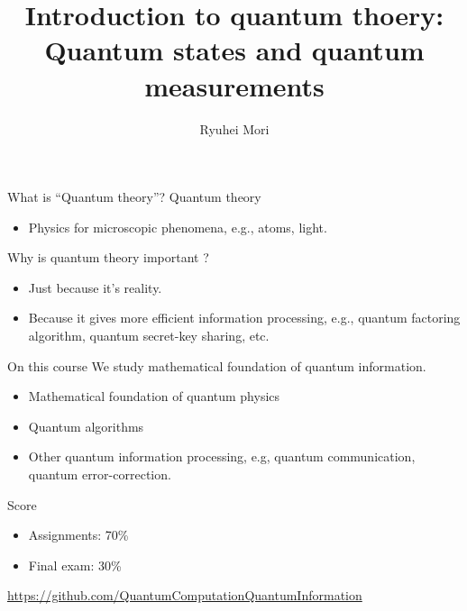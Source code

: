 \documentclass{beamer}
\title{Introduction to quantum thoery: Quantum states and quantum measurements}
\author{Ryuhei Mori}
\institute{Tokyo Institute of Technology}
\begin{document}
\begin{frame}[plain]
\maketitle
\end{frame}


\begin{frame}{What is ``Quantum theory''?}
Quantum theory

\vspace{1em}
\begin{itemize}
\item Physics for microscopic phenomena, e.g., atoms, light.
\end{itemize}

\vspace{2em}
Why is quantum theory important ?

\vspace{1em}
\begin{itemize}
\setlength{\itemsep}{2em}
\item Just because it's reality.
\item Because it gives more efficient information processing, e.g., quantum factoring algorithm, quantum secret-key sharing, etc.
\end{itemize}
\end{frame}

\begin{frame}{On this course}
We study mathematical foundation of quantum information.
\begin{itemize}
\setlength{\itemsep}{1em}
\item Mathematical foundation of quantum physics
\item Quantum algorithms
\item Other quantum information processing, e.g, quantum communication, quantum error-correction.
\end{itemize}

\vspace{2em}
Score
\begin{itemize}
\item Assignments: 70\%
\item Final exam: 30\%
\end{itemize}

\vfill
\url{https://github.com/QuantumComputationQuantumInformation}
\end{frame}
\end{document}
